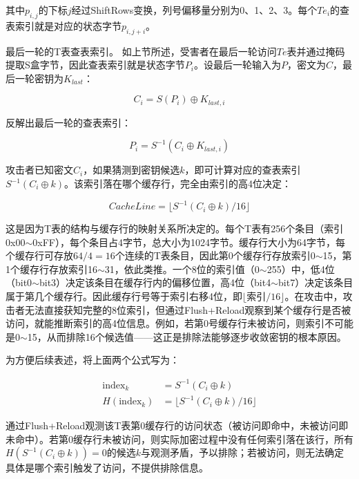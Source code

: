 其中$p_{i,j}$的下标$j$经过ShiftRows变换，列号偏移量分别为0、1、2、3。每个$Te_i$的查表索引就是对应的状态字节$p_{i,j+i}$。

最后一轮的T表查表索引。
如上节所述，受害者在最后一轮访问$Te$表并通过掩码提取S盒字节，因此查表索引就是状态字节$P_i$。设最后一轮输入为$P$，密文为$C$，最后一轮密钥为$K_{last}$：

\begin{equation}
C_i = S(P_i) \oplus K_{last,i}
\end{equation}

反解出最后一轮的查表索引：

\begin{equation}
P_i = S^{-1}(C_i \oplus K_{last,i})
\end{equation}

攻击者已知密文$C_i$，如果猜测到密钥候选$k$，即可计算对应的查表索引$S^{-1}(C_i \oplus k)$。该索引落在哪个缓存行，完全由索引的高4位决定：

\begin{equation}
CacheLine = \lfloor S^{-1}(C_i \oplus k) / 16 \rfloor
\end{equation}

这是因为T表的结构与缓存行的映射关系所决定的。每个T表有256个条目（索引0x00$\sim$0xFF），每个条目占4字节，总大小为1024字节。缓存行大小为64字节，每个缓存行可存放$64/4=16$个连续的T表条目，因此第0个缓存行存放索引0$\sim$15，第1个缓存行存放索引16$\sim$31，依此类推。一个8位的索引值（0$\sim$255）中，低4位（bit0$\sim$bit3）决定该条目在缓存行内的偏移位置，高4位（bit4$\sim$bit7）决定该条目属于第几个缓存行。因此缓存行号等于索引右移4位，即$\lfloor \text{索引}/16 \rfloor$。在攻击中，攻击者无法直接获知完整的8位索引，但通过Flush+Reload观察到某个缓存行是否被访问，就能推断索引的高4位信息。例如，若第0号缓存行未被访问，则索引不可能是0$\sim$15，从而排除16个候选值——这正是排除法能够逐步收敛密钥的根本原因。

为方便后续表述，将上面两个公式写为：

\begin{align}
\text{index}_k &= S^{-1}(C_i \oplus k) \\
H(\text{index}_k) &= \lfloor S^{-1}(C_i \oplus k) / 16 \rfloor
\end{align}

通过Flush+Reload观测该T表第0缓存行的访问状态（被访问即命中，未被访问即未命中）。若第0缓存行未被访问，则实际加密过程中没有任何索引落在该行，所有$H(S^{-1}(C_i \oplus k)) = 0$的候选$k$与观测矛盾，予以排除；若被访问，则无法确定具体是哪个索引触发了访问，不提供排除信息。

